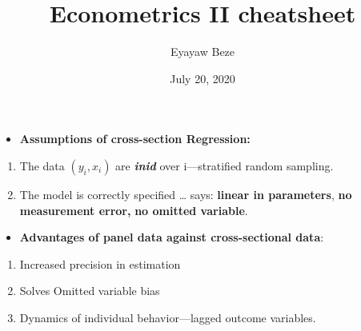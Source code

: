 \documentclass[
]{article}
\title{Econometrics II cheatsheet}
\author{Eyayaw Beze}
\date{July 20, 2020}
\providecommand{\tightlist}{%
  \setlength{\itemsep}{0pt}\setlength{\parskip}{0pt}}
\begin{document}
\maketitle

\begin{itemize}
\tightlist
\item
  \textbf{Assumptions of cross-section Regression:}
\end{itemize}

\begin{enumerate}
\def\labelenumi{(\arabic{enumi})}
\tightlist
\item
  The data \((y_i, x_i)\) are \textbf{\emph{inid}} over i---stratified
  random sampling.
\item
  The model is correctly specified \ldots{} says: \textbf{linear in
  parameters}, \textbf{no measurement error,} \textbf{no omitted
  variable}.
\end{enumerate}

\begin{itemize}
\tightlist
\item
  \textbf{Advantages of panel data against cross-sectional data}:
\end{itemize}

\begin{enumerate}
\def\labelenumi{\arabic{enumi}.}
\tightlist
\item
  Increased precision in estimation
\item
  Solves Omitted variable bias
\item
  Dynamics of individual behavior---lagged outcome variables.
\end{enumerate}
\end{document}
